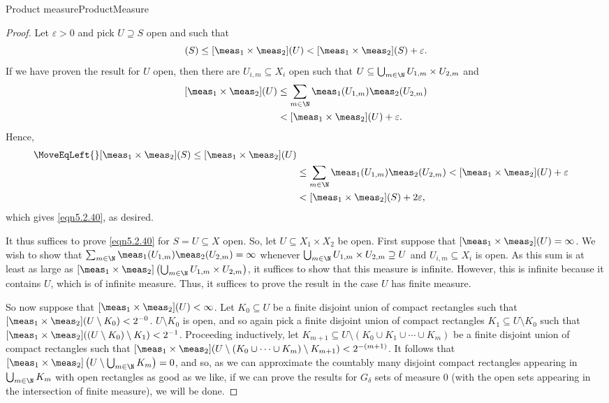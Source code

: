 \begin{thm}{Product measure}{ProductMeasure}
\begin{proof}
Let $\varepsilon >0$ and pick $U\supseteq S$ open and such that
\begin{equation}
[\meas _1\times \meas _2](S)\leq [\meas _1\times \meas _2](U)<[\meas _1\times \meas _2](S)+\varepsilon .
\end{equation}
If we have proven the result for $U$ open, then there are $U_{i,m}\subseteq X_i$ open such that $U\subseteq \bigcup _{m\in \N}U_{1,m}\times U_{2,m}$ and
\begin{equation}
\begin{split}
[\meas _1\times \meas _2](U) & \leq \sum _{m\in \N}\meas _1(U_{1,m})\meas _2(U_{2,m}) \\
& <[\meas _1\times \meas _2](U)+\varepsilon .
\end{split}
\end{equation}
Hence,
\begin{equation}
\begin{split}
\MoveEqLeft {}
[\meas _1\times \meas _2](S)\leq [\meas _1\times \meas _2](U) \\
& \leq \sum _{m\in \N}\meas _1(U_{1,m})\meas _2(U_{2,m})<[\meas _1\times \meas _2](U)+\varepsilon \\
& <[\meas _1\times \meas _2](S)+2\varepsilon ,
\end{split}
\end{equation}
which gives \eqref{eqn5.2.40}, as desired.

It thus suffices to prove \eqref{eqn5.2.40} for $S=U\subseteq X$ open.  So, let $U\subseteq X_1\times X_2$ be open.  First suppose that $[\meas _1\times \meas _2](U)=\infty$.  We wish to show that $\sum _{m\in \N}\meas _1(U_{1,m})\meas _2(U_{2,m})=\infty$ whenever $\bigcup _{m\in \N}U_{1,m}\times U_{2,m}\supseteq U$ and $U_{i,m}\subseteq X_i$ is open.  As this sum is at least as large as $[\meas _1\times \meas _2]\left( \bigcup _{m\in \N}U_{1,m}\times U_{2,m}\right)$, it suffices to show that this measure is infinite.  However, this is infinite because it contains $U$, which is of infinite measure.  Thus, it suffices to prove the result in the case $U$ has finite measure.

So now suppose that $[\meas _1\times \meas _2](U)<\infty$.  Let $K_0\subseteq U$ be a finite disjoint union of compact rectangles such that $[\meas _1\times \meas _2](U\setminus K_0)<2^{-0}$.  $U\setminus K_0$ is open, and so again pick a finite disjoint union of compact rectangles $K_1\subseteq U\setminus K_0$ such that $[\meas _1\times \meas _2]((U\setminus K_0)\setminus K_1)<2^{-1}$.  Proceeding inductively, let $K_{m+1}\subseteq U\setminus (K_0\cup K_1\cup \cdots \cup K_m)$ be a finite disjoint union of compact rectangles such that $[\meas _1\times \meas _2](U\setminus (K_0\cup \cdots \cup K_m)\setminus K_{m+1})<2^{-(m+1)}$.  It follows that $[\meas _1\times \meas _2]\left( U\setminus \bigcup _{m\in \N}K_m\right) =0$, and so, as we can approximate the countably many disjoint compact rectangles appearing in $\bigcup _{m\in \N}K_m$ with open rectangles as good as we like, if we can prove the results for $G_{\delta}$ sets of measure $0$ (with the open sets appearing in the intersection of finite measure), we will be done.


\end{proof}
\end{thm}
